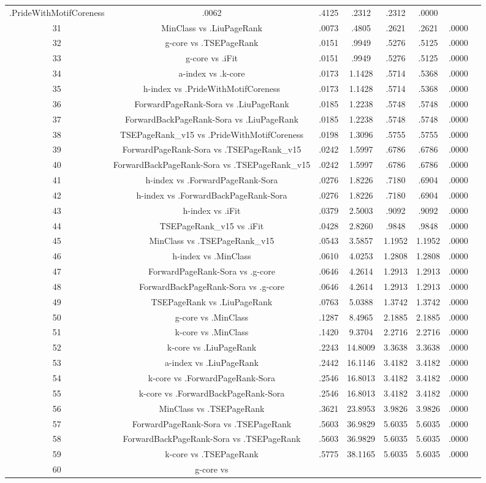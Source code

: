 \documentclass[a4paper,10pt]{article}
\begin{document}
\begin{landscape}
\begin{table}[!htp]
\begin{tabular}{cccccccc}
.PrideWithMotifCoreness&.0062&.4125&.2312&.2312&.0000\\31&MinClass vs .LiuPageRank&.0073&.4805&.2621&.2621&.0000\\32&g-core vs .TSEPageRank&.0151&.9949&.5276&.5125&.0000\\33&g-core vs .iFit&.0151&.9949&.5276&.5125&.0000\\34&a-index vs .k-core&.0173&1.1428&.5714&.5368&.0000\\35&h-index vs .PrideWithMotifCoreness&.0173&1.1428&.5714&.5368&.0000\\36&ForwardPageRank-Sora vs .LiuPageRank&.0185&1.2238&.5748&.5748&.0000\\37&ForwardBackPageRank-Sora vs .LiuPageRank&.0185&1.2238&.5748&.5748&.0000\\38&TSEPageRank_v15 vs .PrideWithMotifCoreness&.0198&1.3096&.5755&.5755&.0000\\39&ForwardPageRank-Sora vs .TSEPageRank_v15&.0242&1.5997&.6786&.6786&.0000\\40&ForwardBackPageRank-Sora vs .TSEPageRank_v15&.0242&1.5997&.6786&.6786&.0000\\41&h-index vs .ForwardPageRank-Sora&.0276&1.8226&.7180&.6904&.0000\\42&h-index vs .ForwardBackPageRank-Sora&.0276&1.8226&.7180&.6904&.0000\\43&h-index vs .iFit&.0379&2.5003&.9092&.9092&.0000\\44&TSEPageRank_v15 vs .iFit&.0428&2.8260&.9848&.9848&.0000\\45&MinClass vs .TSEPageRank_v15&.0543&3.5857&1.1952&1.1952&.0000\\46&h-index vs .MinClass&.0610&4.0253&1.2808&1.2808&.0000\\47&ForwardPageRank-Sora vs .g-core&.0646&4.2614&1.2913&1.2913&.0000\\48&ForwardBackPageRank-Sora vs .g-core&.0646&4.2614&1.2913&1.2913&.0000\\49&TSEPageRank vs .LiuPageRank&.0763&5.0388&1.3742&1.3742&.0000\\50&g-core vs .MinClass&.1287&8.4965&2.1885&2.1885&.0000\\51&k-core vs .MinClass&.1420&9.3704&2.2716&2.2716&.0000\\52&k-core vs .LiuPageRank&.2243&14.8009&3.3638&3.3638&.0000\\53&a-index vs .LiuPageRank&.2442&16.1146&3.4182&3.4182&.0000\\54&k-core vs .ForwardPageRank-Sora&.2546&16.8013&3.4182&3.4182&.0000\\55&k-core vs .ForwardBackPageRank-Sora&.2546&16.8013&3.4182&3.4182&.0000\\56&MinClass vs .TSEPageRank&.3621&23.8953&3.9826&3.9826&.0000\\57&ForwardPageRank-Sora vs .TSEPageRank&.5603&36.9829&5.6035&5.6035&.0000\\58&ForwardBackPageRank-Sora vs .TSEPageRank&.5603&36.9829&5.6035&5.6035&.0000\\59&k-core vs .TSEPageRank&.5775&38.1165&5.6035&5.6035&.0000\\60&g-core vs 
\end{tabular}
\end{table}
\end{landscape}
\end{document}
